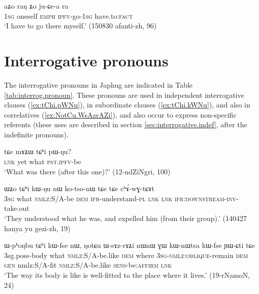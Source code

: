 \begin{exe}
\ex \label{ex:aZo.raN.Zo}
\gll aʑo raŋ ʑo ju-ɕe-a ra \\
\textsc{1sg} oneself \textsc{emph} \textsc{ipfv}-go-\textsc{1sg} have.to:\textsc{fact} \\
\glt `I have to go there myself.' (150830 afanti-zh, 96)
\end{exe}
\section{Interrogative pronouns}
The interrogative pronouns in Japhug are indicated in Table \ref{tab:interrog.pronoun}. These pronouns are used in independent interrogative clauses (\ref{ex:tChi.pWNu}), in subordinate clauses (\ref{ex:tChi.kWNu}), and also in correlatives (\ref{ex:NotCu.WsAzrAZi}), and also occur to express non-specific referents (these uses are described in section  \ref{sec:interrogative.indef}, after the indefinite pronouns).

\begin{exe}
\ex \label{ex:tChi.pWNu}
\gll
tɕe mɤʑɯ tɕʰi pɯ-ŋu? \\
\textsc{lnk} yet what \textsc{pst.ipfv}-be \\
\glt `What was there (after this one)?' (12-ndZiNgri, 100)
\end{exe}  

\begin{exe}
\ex \label{ex:tChi.kWNu}
\gll ɯʑo tɕʰi kɯ-ŋu nɯ ko-tso-nɯ tɕe tɕe cʰɤ́-wɣ-tɕɤt \\
\textsc{3sg} what \textsc{nmlz}:S/A-be \textsc{dem} \textsc{ifr}-understand-\textsc{pl} \textsc{lnk} \textsc{lnk} \textsc{ifr:downstream-inv}-take.out \\
\glt `They understood what he was, and expelled him (from their group).' (140427 hanya yu gezi-zh, 19)
\end{exe}  

\begin{exe}
\ex \label{ex:NotCu.WsAzrAZi}
\gll 
ɯ-pʰoŋbu tɕʰi kɯ-fse nɯ, ŋotɕu ɯ-sɤz-rɤʑi nɯnɯ ɣɯ kɯ-nɯtsa kɯ-fse ɲɯ-ɕti tɕe \\
3sg.poss-body what \textsc{nmlz}:S/A-be.like \textsc{dem} where \textsc{3sg-nmlz:oblique}-remain \textsc{dem} \textsc{gen}  nmlz:S/A-fit \textsc{nmlz}:S/A-be.like \textsc{sens}-be:\textsc{affirm} \textsc{lnk} \\
\glt `The way its body is like is well-fitted to the place where it lives.' (19-rNamoN, 24)
\end{exe}  

